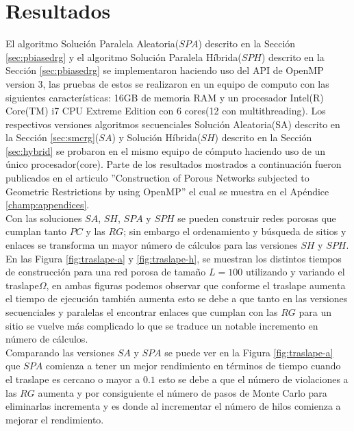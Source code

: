 \chapter{Resultados}
\label{champ:results}
\bigskip
\barra
\bigskip
El algoritmo Solución Paralela Aleatoria($SPA$) descrito en la Sección \ref{sec:pbiasedrg} y el algoritmo Solución Paralela Híbrida($SPH$) descrito en la Sección \ref{sec:pbiasedrg} se implementaron haciendo uso del API de OpenMP version 3, las pruebas de estos se realizaron en un equipo de computo con las siguientes características: 16GB de memoria  RAM y un procesador Intel(R) Core(TM) i7 CPU  Extreme Edition con 6 cores(12 con multithreading). Los respectivos versiones  algoritmos secuenciales Solución Aleatoria(SA) descrito en la Sección \ref{sec:smcrg}($SA$) y Solución Híbrida($SH$) descrito en la Sección \ref{sec:hybrid} se probaron en el mismo equipo de cómputo haciendo uso de un único procesador(core). Parte de los resultados mostrados a continuación fueron publicados en el articulo ''Construction of Porous Networks subjected to Geometric Restrictions by using OpenMP''\cite{ref16} el cual se muestra en el Apéndice \ref{champ:appendices}.\\

Con las soluciones $SA$, $SH$, $SPA$ y $SPH$ se pueden construir redes porosas que cumplan tanto $PC$ y las $RG$; sin embargo el ordenamiento y búsqueda de sitios y enlaces se transforma un mayor número de cálculos para las versiones $SH$ y $SPH$. En las Figura \ref{fig:traslape-a} y \ref{fig:traslape-h}, se muestran los distintos tiempos de construcción para una red porosa de tamaño $L=100$ utilizando y variando el traslape$\Omega$, en ambas figuras podemos observar que conforme el traslape aumenta el tiempo de ejecución también aumenta esto se debe a que tanto en las versiones secuenciales y paralelas el encontrar enlaces que cumplan con las $RG$ para un sitio se vuelve más complicado lo que se traduce un notable incremento en número de cálculos.\\

Comparando las versiones $SA$ y $SPA$ se puede ver en la Figura \ref{fig:traslape-a} que $SPA$ comienza a tener un mejor rendimiento en términos de tiempo cuando el traslape es cercano o mayor a $0.1$ esto se debe a que el número de violaciones a las $RG$ aumenta y por consiguiente el número de pasos de Monte Carlo para eliminarlas incrementa y es donde al incrementar el número de hilos comienza a mejorar el rendimiento.\\

